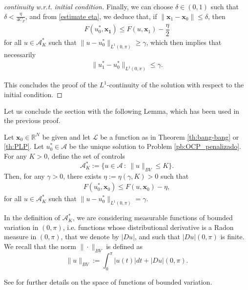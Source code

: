 \documentclass[9pt,shortpaper,twoside,web]{ieeecolor}
\begin{document}
\begin{proof}[continuity w.r.t. initial condition]
	Finally, we can choose $\delta \in (0,1)$ such that $\delta <\frac{\eta}{4C_F}$,  and from \eqref{estimate eta}, we deduce that, if $\|\bm{x}_1 - \bm{x}_0\| \leq \delta$, then
	\begin{align*} 
		F(u_0^\ast, \bm{x_1})  \leq F(u,  \bm{x}_1)  - \dfrac{\eta}{2}
	\end{align*} 
	for all $u\in \mathcal{A}_K^\ast$ such that  $\| u-u_0^\ast\|_{L^1(0,\pi)} \geq \gamma$, which then implies that necessarily
	\begin{align*} 
		\| u_1^\ast-u_0^\ast\|_{L^1(0,\pi)} \leq \gamma.   
	\end{align*}
	
	This concludes the proof of the $L^1$-continuity of the solution with respect to the initial condition.
\end{proof}

Let us conclude the section with the following Lemma, which has been used in the previous proof.

\begin{lemma}\label{lem: compactness}
	Let $\bm{x}_0\in \mathbb{R}^N$ be given and let $\mathcal{L}$ be a function as in Theorem \ref{th:bang-bang} or \ref{th:PLP}. Let $u^\ast_0\in\mathcal{A}$ be the unique solution to Problem \ref{pb:OCP_penalizado}. For any $K>0$, define the set of controls
	\begin{equation}\label{A star K}
		\mathcal{A}_K^\ast := \{ u\in \mathcal{A}\, : \ \| u\|_{BV} \leq K \}.
	\end{equation}
	Then, for any $\gamma >0$, there exists $\eta:=\eta(\gamma ,K)>0$ such that
	\begin{align*}
		F(u^\ast_0, \bm{x}_0 ) \leq F(u, \bm{x}_0 ) - \eta, 
	\end{align*}
	for all $u\in \mathcal{A}_K^\ast$ such that $\|u - u_0^\ast\|_{L^1(0,\pi)} = \gamma$.
\end{lemma}

In the definition of $\mathcal{A}_K^\ast$,  we are considering measurable functions of bounded variation in $(0,\pi)$, i.e. functions whose distributional derivative is a Radon measure in $(0,\pi)$, that we denote by $|Du|$, and such that $|Du|(0,\pi)$ is finite.
We recall that the norm $\| \cdot\|_{BV}$ is defined as
\begin{equation}\label{BV norm}
	\| u\|_{BV} := \int_0^\pi |u(t)|dt + |Du| (0,\pi ).
\end{equation}

See \cite[Chapter 3]{ambrosio2000functions} for further details on the space of functions of bounded variation.
\end{document}

